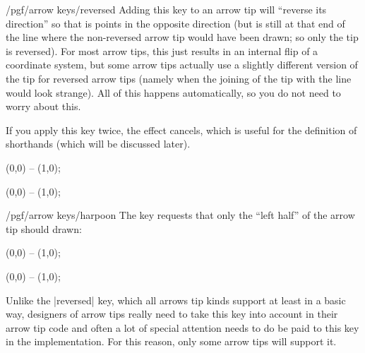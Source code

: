 \begin{key}{/pgf/arrow keys/reversed}
    Adding this key to an arrow tip will ``reverse its direction'' so that is
    points in the opposite direction (but is still at that end of the line
    where the non-reversed arrow tip would have been drawn; so only the tip is
    reversed). For most arrow tips, this just results in an internal flip of a
    coordinate system, but some arrow tips actually use a slightly different
    version of the tip for reversed arrow tips (namely when the joining of the
    tip with the line would look strange). All of this happens automatically,
    so you do not need to worry about this.

    If you apply this key twice, the effect cancels, which is useful for the
    definition of shorthands (which will be discussed later).
\begin{codeexample}[width=3cm,preamble={\usetikzlibrary{arrows.meta}}]
 \draw [arrows = {-Stealth[reversed]}] (0,0) -- (1,0);
\end{codeexample}
\begin{codeexample}[width=3cm,preamble={\usetikzlibrary{arrows.meta}}]
 \draw [arrows = {-Stealth[reversed, reversed]}] (0,0) -- (1,0);
\end{codeexample}
\end{key}

\begin{key}{/pgf/arrow keys/harpoon}
    The key requests that only the ``left half'' of the arrow tip should drawn:
\begin{codeexample}[width=3cm,preamble={\usetikzlibrary{arrows.meta}}]
 \draw [arrows = {-Stealth[harpoon]}] (0,0) -- (1,0);
\end{codeexample}
\begin{codeexample}[width=3cm,preamble={\usetikzlibrary{arrows.meta}}]
 \draw [arrows = {->[harpoon]}] (0,0) -- (1,0);
\end{codeexample}
    Unlike the |reversed| key, which all arrows tip kinds support at least in a
    basic way, designers of arrow tips really need to take this key into
    account in their arrow tip code and often a lot of special attention needs
    to do be paid to this key in the implementation. For this reason, only some
    arrow tips will support it.
\end{key}

